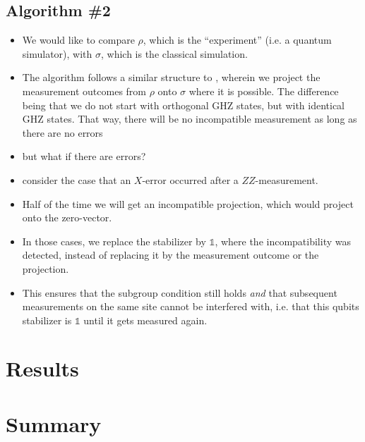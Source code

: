 \subsection{Algorithm \#2}
\begin{itemize}
  \item We would like to compare $\rho$, which is the \enquote{experiment}
    (i.e. a quantum simulator), with $\sigma$, which is the classical
    simulation.
  \item The algorithm follows a similar structure to
    \cite{liCrossEntropyBenchmark2023}, wherein we project the measurement
    outcomes from $\rho$ onto $\sigma$ where it is possible. The difference
    being that we do not start with orthogonal GHZ states, but with identical
    GHZ states. That way, there will be no incompatible measurement as long as
    there are no errors
  \item but what if there are errors?
  \item consider the case that an $X$-error occurred after a $ZZ$-measurement.
  \item Half of the time we will get an incompatible projection, which would
    project onto the zero-vector.
  \item In those cases, we replace the stabilizer by $\mathds{1}$, where the
    incompatibility was detected, instead of replacing it by the measurement
    outcome or the projection.
  \item This ensures that the subgroup condition still holds \emph{and} that
    subsequent measurements on the same site cannot be interfered with, i.e.
    that this qubits stabilizer is $\mathds{1}$ until it gets measured again.
\end{itemize}
\section{Results}
\section{Summary}

